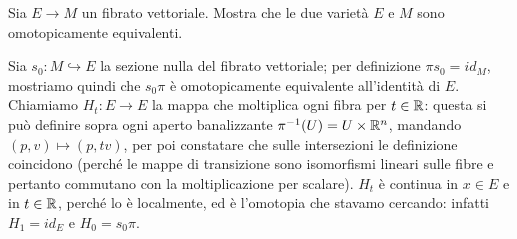 \documentclass[a4paper]{article}
\begin{document}
\begin{ex}[7.1]{Sia $ E \to M $ un fibrato vettoriale. Mostra che le due varietà $ E $ e $ M $ sono omotopicamente equivalenti.}
	
	Sia $ s_0 \colon M \hookrightarrow E $ la sezione nulla del fibrato vettoriale; per definizione $ \pi s_0 = id_M $, mostriamo quindi che $ s_0\pi $ è omotopicamente equivalente all'identità di $ E $.
	Chiamiamo $ H_t\colon E \to E $ la mappa che moltiplica ogni fibra per $ t \in \mathbb{R} $: questa si può definire sopra ogni aperto banalizzante $ \pi^{-1}(U) = U \times \mathbb{R}^n $, mandando $ (p, v) \mapsto (p,tv) $, per poi constatare che sulle intersezioni le definizione coincidono (perché le mappe di transizione sono isomorfismi lineari sulle fibre e pertanto commutano con la moltiplicazione per scalare). $ H_t $ è continua in $ x \in E $ e in $ t \in \mathbb{R} $, perché lo è localmente, ed è l'omotopia che stavamo cercando: infatti $ H_1 = id_E $ e $ H_0 = s_0\pi. $ 
\end{ex}
\end{document}
